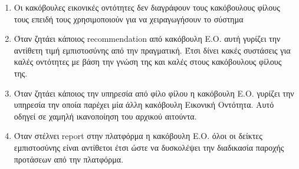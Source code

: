  \begin{enumerate}
 \item Οι κακόβουλες εικονικές οντότητες δεν διαγράφουν τους κακόβουλους φίλους τους επειδή τους χρησιμοποιούν για να χειραγωγήσουν το σύστημα
 \item Όταν ζητάει κάποιος recommendation από κακόβουλη Ε.Ο. αυτή γυρίζει την αντίθετη τιμή εμπιστοσύνης από την πραγματική. Έτσι δίνει κακές συστάσεις για καλές οντότητες με βάση την γνώση της και καλές στους κακόβουλους φίλους της.
 \item Όταν ζητάει κάποιος την υπηρεσία από φίλο φίλου η κακόβουλη Ε.Ο. γυρίζει την υπηρεσία την οποία παρέχει μία άλλη κακόβουλη Εικονική Οντότητα. Αυτό οδηγεί σε χαμηλή ικανοποίηση του αρχικού αιτούντα.
 \item Όταν στέλνει report στην πλατφόρμα η κακόβουλη Ε.Ο. όλοι οι δείκτες εμπιστοσύνης είναι αντίθετοι έτσι ώστε να δυσκολέψει την διαδικασία παροχής προτάσεων από την πλατφόρμα.
 \end{enumerate}


